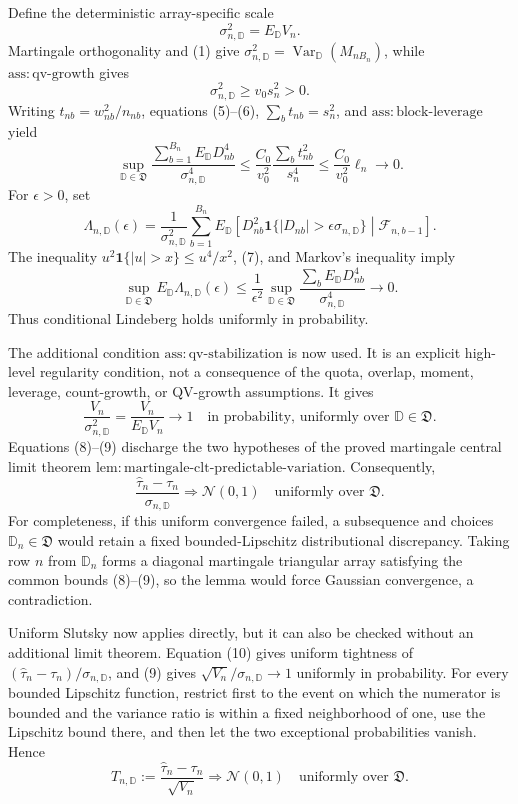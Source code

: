 Define the deterministic array-specific scale
\[
\sigma_{n,\mathbb D}^2=E_{\mathbb D}V_n.
\]
Martingale orthogonality and (1) give \(\sigma_{n,\mathbb D}^2=\operatorname{Var}_{\mathbb D}(M_{nB_n})\), while \(\mathrm{ass:qv\text{-}growth}\) gives
\[
\sigma_{n,\mathbb D}^2\ge v_0s_n^2>0.
\tag{6}
\]
Writing \(t_{nb}=w_{nb}^2/n_{nb}\), equations (5)--(6), \(\sum_bt_{nb}=s_n^2\), and \(\mathrm{ass:block\text{-}leverage}\) yield
\[
\sup_{\mathbb D\in\mathfrak D}
\frac{\sum_{b=1}^{B_n}E_{\mathbb D}D_{nb}^4}{\sigma_{n,\mathbb D}^4}
\le\frac{C_0}{v_0^2}\frac{\sum_bt_{nb}^2}{s_n^4}
\le\frac{C_0}{v_0^2}\ell_n\longrightarrow0.
\tag{7}
\]
For \(\epsilon>0\), set
\[
\Lambda_{n,\mathbb D}(\epsilon)
=\frac1{\sigma_{n,\mathbb D}^2}\sum_{b=1}^{B_n}
E_{\mathbb D}\!\left[D_{nb}^2\mathbf1\{|D_{nb}|>\epsilon\sigma_{n,\mathbb D}\}
\middle|\mathcal F_{n,b-1}\right].
\]
The inequality \(u^2\mathbf1\{|u|>x\}\le u^4/x^2\), (7), and Markov's inequality imply
\[
\sup_{\mathbb D\in\mathfrak D}E_{\mathbb D}\Lambda_{n,\mathbb D}(\epsilon)
\le\frac1{\epsilon^2}
\sup_{\mathbb D\in\mathfrak D}
\frac{\sum_bE_{\mathbb D}D_{nb}^4}{\sigma_{n,\mathbb D}^4}
\longrightarrow0.
\tag{8}
\]
Thus conditional Lindeberg holds uniformly in probability.

The additional condition \(\mathrm{ass:qv\text{-}stabilization}\) is now used. It is an explicit high-level regularity condition, not a consequence of the quota, overlap, moment, leverage, count-growth, or QV-growth assumptions. It gives
\[
\frac{V_n}{\sigma_{n,\mathbb D}^2}
=\frac{V_n}{E_{\mathbb D}V_n}\longrightarrow1
\quad\text{in probability, uniformly over }\mathbb D\in\mathfrak D.
\tag{9}
\]
Equations (8)--(9) discharge the two hypotheses of the proved martingale central limit theorem \(\mathrm{lem:martingale\text{-}clt\text{-}predictable\text{-}variation}\). Consequently,
\[
\frac{\widehat\tau_n-\tau_n}{\sigma_{n,\mathbb D}}
\Rightarrow\mathcal N(0,1)
\quad\text{uniformly over }\mathfrak D.
\tag{10}
\]
For completeness, if this uniform convergence failed, a subsequence and choices \(\mathbb D_n\in\mathfrak D\) would retain a fixed bounded-Lipschitz distributional discrepancy. Taking row \(n\) from \(\mathbb D_n\) forms a diagonal martingale triangular array satisfying the common bounds (8)--(9), so the lemma would force Gaussian convergence, a contradiction.

Uniform Slutsky now applies directly, but it can also be checked without an additional limit theorem. Equation (10) gives uniform tightness of \((\widehat\tau_n-\tau_n)/\sigma_{n,\mathbb D}\), and (9) gives \(\sqrt{V_n}/\sigma_{n,\mathbb D}\to1\) uniformly in probability. For every bounded Lipschitz function, restrict first to the event on which the numerator is bounded and the variance ratio is within a fixed neighborhood of one, use the Lipschitz bound there, and then let the two exceptional probabilities vanish. Hence
\[
T_{n,\mathbb D}:=\frac{\widehat\tau_n-\tau_n}{\sqrt{V_n}}
\Rightarrow\mathcal N(0,1)
\quad\text{uniformly over }\mathfrak D.
\tag{11}
\]

